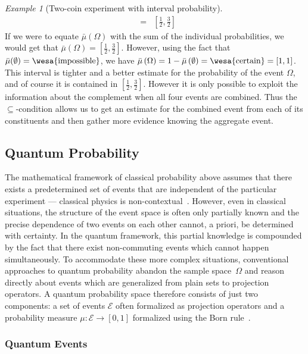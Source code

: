 \documentclass{article}
\theoremstyle{remark}
\newtheorem{example}{Example}\newtheorem{definition}{Definition}\newtheorem{thm}{Theorem}
\newcommand{\qevents}{\ensuremath{\mathcal{E}}}
\newcommand{\imposs}{{\mbox{\wesa{impossible}}}}
\newcommand{\necess}{{\mbox{\wesa{certain}}}}
\begin{document}
\begin{example}[Two-coin experiment with interval probability]
\begin{eqnarray*}
 & = & \left[\frac{1}{2},\frac{3}{2}\right]
\end{eqnarray*}
If we were to equate $\bar{\mu}(\Omega)$ with the sum of the individual
probabilities, we would get that $\bar{\mu}(\Omega)=\left[\frac{1}{2},\frac{3}{2}\right]$.
However, using the fact that $\bar{\mu}(\emptyset)=\imposs$, we have
$\bar{\mu}\left(\Omega\right)=1-\bar{\mu}\left(\emptyset\right)=\necess=[1,1]$.
This interval is tighter and a better estimate for the probability
of the event $\Omega$, and of course it is contained in $[\frac{1}{2},\frac{3}{2}]$.
However it is only possible to exploit the information about the complement
when all four events are combined. Thus the $\subseteq$-condition
allows us to get an estimate for the combined event from each of its
constituents and then gather more evidence knowing the aggregate event.
\end{example}



\subsection{Quantum Probability}

The mathematical framework of classical probability above assumes
that there exists a predetermined set of events that are independent
of the particular experiment — classical physics is non-contextual~\cite{kochenspecker1967,Redhead1987-REDINA,peres1995quantum,Jaeger2007}.
However, even in classical situations, the structure of the event
space is often only partially known and the precise dependence of
two events on each other cannot, a priori, be determined with certainty.
In the quantum framework, this partial knowledge is compounded by
the fact that there exist non-commuting events which cannot happen
simultaneously. To accommodate these more complex situations, conventional
approaches to quantum probability abandon the sample space~$\Omega$
and reason directly about events which are generalized from plain
sets to projection operators. A quantum probability space therefore
consists of just two components: a set of events $\qevents$ often
formalized as projection operators and a probability measure $\mu:\qevents\rightarrow[0,1]$
formalized using the Born rule~\cite{Born1983,Mermin2007,Jaeger2007}.



\subsubsection{Quantum Events}
\end{document}
